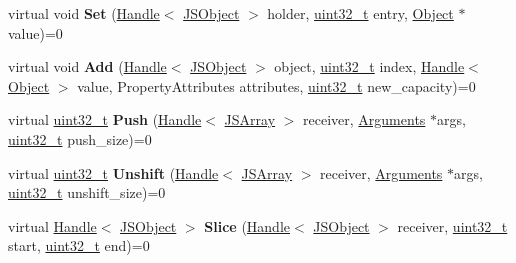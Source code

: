 \begin{DoxyCompactItemize}
\item 
\mbox{\label{classv8_1_1internal_1_1ElementsAccessor_af5f61070137e520a0f03de5dca6ccc42}} 
virtual void {\bfseries Set} (\mbox{\hyperlink{classv8_1_1internal_1_1Handle}{Handle}}$<$ \mbox{\hyperlink{classv8_1_1internal_1_1JSObject}{J\+S\+Object}} $>$ holder, \mbox{\hyperlink{classuint32__t}{uint32\+\_\+t}} entry, \mbox{\hyperlink{classv8_1_1internal_1_1Object}{Object}} $\ast$value)=0
\item 
\mbox{\label{classv8_1_1internal_1_1ElementsAccessor_a8d9a82612743c417f632dbdd3fbf3350}} 
virtual void {\bfseries Add} (\mbox{\hyperlink{classv8_1_1internal_1_1Handle}{Handle}}$<$ \mbox{\hyperlink{classv8_1_1internal_1_1JSObject}{J\+S\+Object}} $>$ object, \mbox{\hyperlink{classuint32__t}{uint32\+\_\+t}} index, \mbox{\hyperlink{classv8_1_1internal_1_1Handle}{Handle}}$<$ \mbox{\hyperlink{classv8_1_1internal_1_1Object}{Object}} $>$ value, Property\+Attributes attributes, \mbox{\hyperlink{classuint32__t}{uint32\+\_\+t}} new\+\_\+capacity)=0
\item 
\mbox{\label{classv8_1_1internal_1_1ElementsAccessor_a022704923340b43a8bbce30e696ceed2}} 
virtual \mbox{\hyperlink{classuint32__t}{uint32\+\_\+t}} {\bfseries Push} (\mbox{\hyperlink{classv8_1_1internal_1_1Handle}{Handle}}$<$ \mbox{\hyperlink{classv8_1_1internal_1_1JSArray}{J\+S\+Array}} $>$ receiver, \mbox{\hyperlink{classv8_1_1internal_1_1Arguments}{Arguments}} $\ast$args, \mbox{\hyperlink{classuint32__t}{uint32\+\_\+t}} push\+\_\+size)=0
\item 
\mbox{\label{classv8_1_1internal_1_1ElementsAccessor_a59f8d7745afe6cf724b3e3fbc0edaceb}} 
virtual \mbox{\hyperlink{classuint32__t}{uint32\+\_\+t}} {\bfseries Unshift} (\mbox{\hyperlink{classv8_1_1internal_1_1Handle}{Handle}}$<$ \mbox{\hyperlink{classv8_1_1internal_1_1JSArray}{J\+S\+Array}} $>$ receiver, \mbox{\hyperlink{classv8_1_1internal_1_1Arguments}{Arguments}} $\ast$args, \mbox{\hyperlink{classuint32__t}{uint32\+\_\+t}} unshift\+\_\+size)=0
\item 
\mbox{\label{classv8_1_1internal_1_1ElementsAccessor_ab181a95207334a075cf08e195b05972b}} 
virtual \mbox{\hyperlink{classv8_1_1internal_1_1Handle}{Handle}}$<$ \mbox{\hyperlink{classv8_1_1internal_1_1JSObject}{J\+S\+Object}} $>$ {\bfseries Slice} (\mbox{\hyperlink{classv8_1_1internal_1_1Handle}{Handle}}$<$ \mbox{\hyperlink{classv8_1_1internal_1_1JSObject}{J\+S\+Object}} $>$ receiver, \mbox{\hyperlink{classuint32__t}{uint32\+\_\+t}} start, \mbox{\hyperlink{classuint32__t}{uint32\+\_\+t}} end)=0

\end{DoxyCompactItemize}
